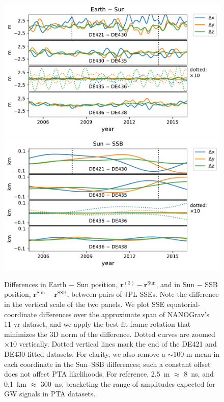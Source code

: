\documentclass[iop,apj,twocolappendix]{emulateapj}
\begin{document}
\begin{figure}[t]
    \centering
    \includegraphics[width=\columnwidth]{figures/EarthSunDiff.pdf}
    \includegraphics[width=\columnwidth]{figures/SunSSBDiff.pdf}
    \caption{Differences in Earth $-$ Sun position, $\mathbf{r}^{(3)} - \mathbf{r}^\mathrm{Sun}$, and in Sun $-$ SSB position, $\mathbf{r}^\mathrm{Sun} - \mathbf{r}^\mathrm{SSB}$, between pairs of JPL SSEs. Note the difference in the vertical scale of the two panels. We plot SSE equatorial-coordinate differences over the approximate span of NANOGrav's 11-yr dataset, and we apply the best-fit frame rotation that minimizes the 3D norm of the difference. Dotted curves are zoomed $\times 10$ vertically. Dotted vertical lines mark the end of the DE421 and DE430 fitted datasets.
    For clarity, we also remove a $\sim 100$-m mean in each coordinate in the Sun--SSB differences; such a constant offset does not affect PTA likelihoods.
    For reference, 2.5~m $\approx$ 8~ns, and 0.1~km $\approx$ 300~ns, bracketing the range of amplitudes expected for GW signals in PTA datasets.
    \label{fig:earthsun}}
\end{figure}
\end{document}
